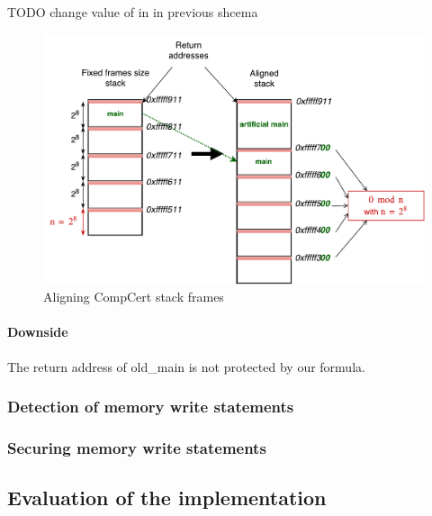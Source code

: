 \documentclass[11pt]{sdm}
\begin{document}
TODO change value of in in previous shcema

\begin{figure}
\centering
\includegraphics[scale=0.6]{images/stack_align.pdf}
\caption{Aligning CompCert stack frames}
\label{stack_align}
\end{figure}

\paragraph{Downside}
\label{par:Downside}
The return address of old\_main is not protected by our formula.


\subsubsection{Detection of memory write statements}
\label{ssub:Detection of memory write statements}

\subsubsection{Securing memory write statements}
\label{ssub:implem_check_address}

\subsection{Evaluation of the implementation}
\label{sub:Evaluation of the implementation}
\end{document}
